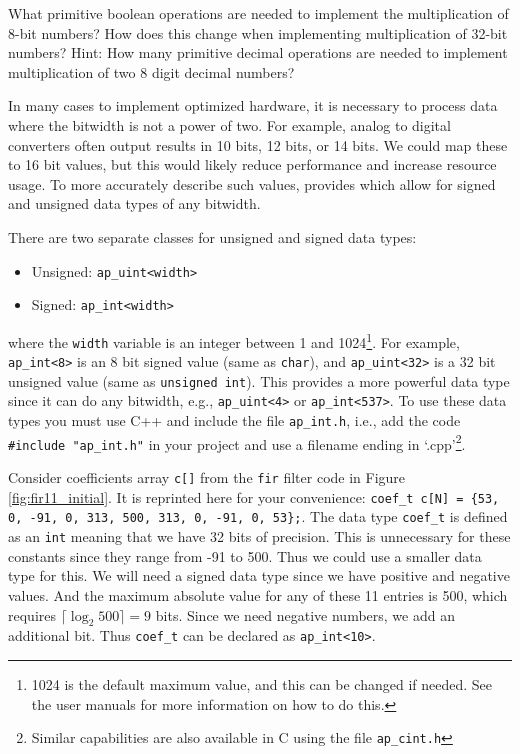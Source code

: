 \begin{exercise}
What primitive boolean operations are needed to implement the multiplication of 8-bit numbers?  How does this change when implementing multiplication of 32-bit numbers?  Hint: How many primitive decimal operations are needed to implement multiplication of two 8 digit decimal numbers? \end{exercise}

In many cases to implement optimized hardware, it is necessary to process data where the bitwidth is not a power of two. For example, analog to digital converters often output results in 10 bits, 12 bits, or 14 bits.  We could map these to 16 bit values, but this would likely reduce performance and increase resource usage.  To more accurately describe such values, \VHLS provides  which allow for signed and unsigned data types of any bitwidth. 

There are two separate classes for unsigned and signed data types:
\begin{itemize}
\item Unsigned: \lstinline{ap_uint<width>}
\item Signed: \lstinline{ap_int<width>}
\end{itemize}
where the \lstinline{width} variable is an integer between 1 and 1024\footnote{1024 is the default maximum value, and this can be changed if needed. See the \VHLS user manuals for more information on how to do this.}.  For example, \lstinline{ap_int<8>} is an 8 bit signed value (same as \lstinline{char}), and \lstinline{ap_uint<32>} is a 32 bit unsigned value (same as \lstinline{unsigned int}). This provides a more powerful data type since it can do any bitwidth, e.g., \lstinline{ap_uint<4>} or \lstinline{ap_int<537>}. To use these data types you must use C++ and include the file \lstinline{ap_int.h}, i.e., add the code \lstinline{#include "ap_int.h"} in your project and use a filename ending in `.cpp'\footnote{Similar capabilities are also available in C using the file \lstinline{ap_cint.h}}.

Consider coefficients array \lstinline{c[]} from the \lstinline{fir} filter code in Figure \ref{fig:fir11_initial}. It is reprinted here for your convenience: \lstinline|coef_t c[N] = {53, 0, -91, 0, 313, 500, 313, 0, -91, 0, 53};|. The data type \lstinline{coef_t} is defined as an \lstinline{int} meaning that we have 32 bits of precision. This is unnecessary for these constants since they range from -91 to 500. Thus we could use a smaller data type for this. We will need a signed data type since we have positive and negative values. And the maximum absolute value for any of these 11 entries is 500, which requires $\lceil \log_2 500 \rceil = 9$ bits. Since we need negative numbers, we add an additional bit. Thus \lstinline{coef_t} can be declared as \lstinline{ap_int<10>}.

